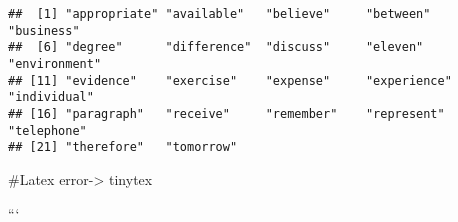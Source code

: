 \documentclass[
]{article}
\begin{document}
\begin{verbatim}
##  [1] "appropriate" "available"   "believe"     "between"     "business"   
##  [6] "degree"      "difference"  "discuss"     "eleven"      "environment"
## [11] "evidence"    "exercise"    "expense"     "experience"  "individual" 
## [16] "paragraph"   "receive"     "remember"    "represent"   "telephone"  
## [21] "therefore"   "tomorrow"
\end{verbatim}

\#Latex error-\textgreater{} tinytex

```
\end{document}
